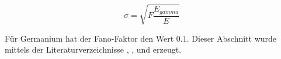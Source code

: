 \begin{equation}
    \sigma = \sqrt{F \frac{E_{gamma}}{E}}
    \label{eq4}
\end{equation}

Für Germanium hat der Fano-Faktor den Wert $\num{0,1}$.
Dieser Abschnitt wurde mittels der Literaturverzeichnisse \cite{lit1},
\cite{lit2}, \cite{lit3} und \cite{lit4} erzeugt.

